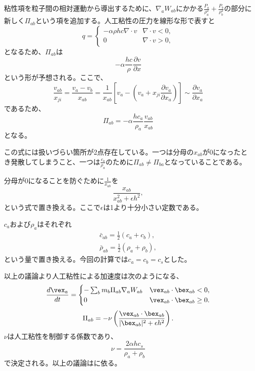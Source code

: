 \documentclass[]{jsarticle}
\begin{document}
粘性項を粒子間の相対運動から導出するために、$\nabla_aW_{ab}$にかかる$\frac{P_a}{\rho_a^2}+\frac{P_b}{\rho_b^2}$の部分に新しく$\Pi_{ab}$という項を追加する。人工粘性の圧力を線形な形で表すと
\begin{equation}
  q=\begin{cases}
    -\alpha \rho h c \nabla \cdot v & \nabla\cdot v<0, \\
    0 & \nabla \cdot v>0,
  \end{cases}
\end{equation}
となるため、$\Pi_{ab}$は
\begin{equation}
  -\alpha \frac{hc}{\rho}\frac{\partial v}{\partial x}
\end{equation}
という形が予想される。ここで、
\begin{equation}
  \frac{v_{ab}}{x_{ji}}=\frac{v_a-v_b}{x_{ab}}=\frac{1}{x_{ab}}\left[ v_a-\left( v_a+x_{ji}\frac{\partial v_a}{\partial x_a} \right) \right] \sim \frac{\partial v_a}{\partial x_a}
\end{equation}
であるため、
\begin{equation}
\Pi_{ab}=-\alpha \frac{hc_a}{\rho_a}\frac{v_{ab}}{x_{ab}}
\end{equation}
となる。

この式には扱いづらい箇所が2点存在している。一つは分母の$x_{ab}$が$0$になったとき発散してしまうこと、一つは$\frac{c_a}{\rho_a}$のために$\Pi_{ab}\neq\Pi_{ba}$となっていることである。

分母が0になることを防ぐために$\frac{1}{x_{ab}}$を
\begin{equation}
\frac{x_{ab}}{x_{ab}^2+\epsilon h^2},
\end{equation}
という式で置き換える。ここで$\epsilon$は1より十分小さい定数である。

$c_a$および$\rho_a$はそれぞれ
\begin{equation}
  \begin{split}
  \bar{c}_{ab}=\frac{1}{2}(c_a+c_b), \\
  \bar{\rho}_{ab}=\frac{1}{2}(\rho_a+\rho_b),
  \end{split}
\end{equation}
という量で置き換える。今回の計算では$c_a=c_b=c_s$とした。

以上の議論より人工粘性による加速度は次のようになる、
\begin{equation}
\frac{d\vex_a}{dt}=\begin{cases}
  -\sum_bm_b\Pi_{ab}\nabla_aW_{ab} & \vex_{ab}\cdot\bex_{ab}<0, \\
  0 & \vex_{ab}\cdot\bex_{ab}\geq0.
\end{cases}
\end{equation}
\begin{equation}
\Pi_{ab}=-\nu\left(\frac{\vex_{ab}\cdot\bex_{ab}}{|\bex_{ab}|^2+\epsilon h^2}\right).
\end{equation}
$\nu$は人工粘性を制御する係数であり、
\begin{equation}
  \label{eqn:kinArtVisc}
  \nu=\frac{2\alpha h c_s}{\rho_a+\rho_b}
\end{equation}
で決定される。以上の議論は\cite{Monaghan1983}に依る。
\end{document}

